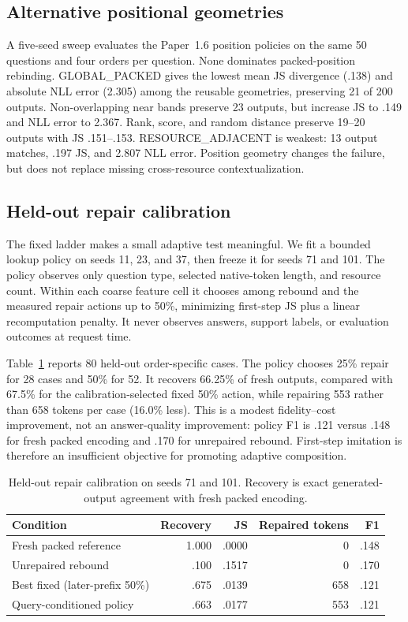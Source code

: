\documentclass[11pt]{article}
\begin{document}
\subsection{Alternative positional geometries}
A five-seed sweep evaluates the Paper~1.6 position policies on the same 50
questions and four orders per question. None dominates packed-position
rebinding. GLOBAL\_PACKED gives the lowest mean JS divergence (.138) and
absolute NLL error (2.305) among the reusable geometries, preserving 21 of 200
outputs. Non-overlapping near bands preserve 23 outputs, but increase JS to
.149 and NLL error to 2.367. Rank, score, and random distance preserve 19--20
outputs with JS .151--.153. RESOURCE\_ADJACENT is weakest: 13 output matches,
.197 JS, and 2.807 NLL error. Position geometry changes the failure, but does
not replace missing cross-resource contextualization.

\subsection{Held-out repair calibration}
The fixed ladder makes a small adaptive test meaningful. We fit a bounded
lookup policy on seeds 11, 23, and 37, then freeze it for seeds 71 and 101.
The policy observes only question type, selected native-token length, and
resource count. Within each coarse feature cell it chooses among rebound and
the measured repair actions up to 50\%, minimizing first-step JS plus a
linear recomputation penalty. It never observes answers, support labels, or
evaluation outcomes at request time.

Table~\ref{tab:heldout-repair} reports 80 held-out order-specific cases. The
policy chooses 25\% repair for 28 cases and 50\% for 52. It recovers 66.25\%
of fresh outputs, compared with 67.5\% for the calibration-selected fixed
50\% action, while repairing 553 rather than 658 tokens per case (16.0\%
less). This is a modest fidelity--cost improvement, not an answer-quality
improvement: policy F1 is .121 versus .148 for fresh packed encoding and .170
for unrepaired rebound. First-step imitation is therefore an insufficient
objective for promoting adaptive composition.

\begin{table}[ht]
\centering
\caption{Held-out repair calibration on seeds 71 and 101. Recovery is exact
generated-output agreement with fresh packed encoding.}
\label{tab:heldout-repair}
\small
\begin{tabular}{lrrrr}
\toprule
Condition & Recovery & JS & Repaired tokens & F1 \\
\midrule
Fresh packed reference & 1.000 & .0000 & 0 & .148 \\
Unrepaired rebound & .100 & .1517 & 0 & .170 \\
Best fixed (later-prefix 50\%) & .675 & .0139 & 658 & .121 \\
Query-conditioned policy & .663 & .0177 & 553 & .121 \\
\bottomrule
\end{tabular}
\end{table}
\end{document}
